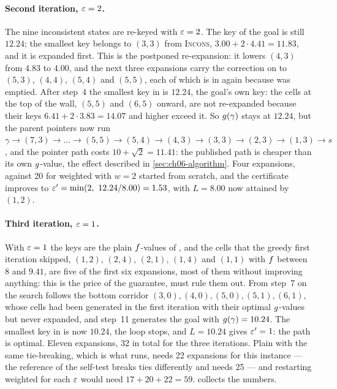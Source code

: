 \paragraph{Second iteration, $\varepsilon = 2$.}
The nine inconsistent states are re-keyed with $\varepsilon = 2$. The key of the goal
is still $12.24$; the smallest key belongs to $(3,3)$ from \textsc{Incons},
$3.00 + 2 \cdot 4.41 = 11.83$, and it is expanded first. This is the postponed
re-expansion: it lowers $(4,3)$ from $4.83$ to $4.00$, and the next three
expansions carry the correction on to $(5,3)$, $(4,4)$, $(5,4)$ and $(5,5)$,
each of which is in \Open again because \Closed was emptied. After step~4 the
smallest key in \Open is $12.24$, the goal's own key: the cells at the top of
the wall, $(5,5)$ and $(6,5)$ onward, are not re-expanded because their keys
$6.41 + 2 \cdot 3.83 = 14.07$ and higher exceed it. So $g(\gamma)$ stays
at $12.24$, but the parent pointers now run $\gamma \to (7,3) \to \dots \to
(5,5) \to (5,4) \to (4,3) \to (3,3) \to (2,3) \to (1,3) \to s$, and the pointer
path costs $10 + \sqrt{2} = 11.41$: the published path is cheaper than its own
$g$-value, the effect described in \cref{sec:ch06-algorithm}. Four
expansions, against 20 for weighted \astar with $w = 2$ started from scratch,
and the certificate improves to $\varepsilon' = \min(2,\ 12.24 / 8.00) = 1.53$, with
$L = 8.00$ now attained by $(1,2)$.

\paragraph{Third iteration, $\varepsilon = 1$.}
With $\varepsilon = 1$ the keys are the plain $f$-values of \astar, and the cells
that the greedy first iteration skipped, $(1,2)$, $(2,4)$, $(2,1)$, $(1,4)$
and $(1,1)$ with $f$ between $8$ and $9.41$, are five of the first six
expansions, most of them without improving anything: this is the price of the guarantee, \astar
must rule them out. From step~7 on the search follows the bottom corridor
$(3,0), (4,0), (5,0), (5,1), (6,1)$, whose cells had been generated in the
first iteration with their optimal $g$-values but never expanded, and
step~11 generates the goal with $g(\gamma) = 10.24$. The smallest key in
\Open is now $10.24$, the loop stops, and $L = 10.24$ gives $\varepsilon' = 1$: the
path is optimal. Eleven expansions, 32 in total for the three iterations.
Plain \astar with the same tie-breaking, which is what
 runs, needs 22 expansions for
this instance --- the reference \astar of the self-test breaks ties
differently and needs 25 --- and restarting weighted \astar for each $\varepsilon$
would need $17 + 20 + 22 = 59$.
 collects the numbers.

